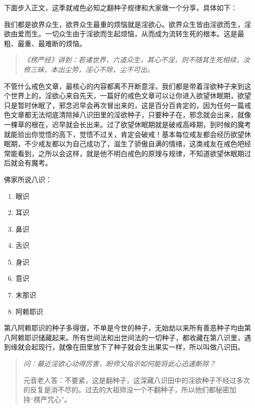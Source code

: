 \documentclass{ctexart}
\begin{document}
下面步入正文，这季就戒色必知之翻种子规律和大家做一个分享，具体如下：

我们都是欲界众生，欲界众生最重的烦恼就是淫欲心。欲界众生皆由淫欲而生，淫欲由爱而生。一切众生由于淫欲而生起烦恼，从而成为流转生死的根本。这是最粗、最重、最难断的烦恼。

\begin{quote}\it
    《楞严经》讲到：若诸世界，六道众生，其心不淫，则不随其生死相续，汝修三昧，本出尘劳，淫心不除，尘不可出。
\end{quote}

不管什么戒色文章，最核心的内容都离不开断意淫，我们都是带着淫欲种子来到这个世界上的，淫欲心来自先天，一篇好的戒色文章可以让你进入欲望休眠期，欲望只是暂时休眠了，邪念迟早会再次冒出来的，这是百分百肯定的，因为任何一篇戒色文章都无法彻底清除掉八识田里的淫欲种子，只要种子在，邪念就会出来，就像一棵草的根在，迟早就会长出来。过了欲望休眠期就是破戒高峰期，到时候的魔考就能验出你觉悟的高下，觉悟不过关，肯定会破戒！基本每位戒友都会经历欲望休眠期，不少戒友都以为自己成功了，滋生了骄傲自满的情绪，这类戒友在戒色吧经常能看到，之所以会这样，就是他不明白戒色的原理与规律，不知道欲望休眠期过后就会有魔考。

佛家所说八识：

\begin{multicols}{4}
    \begin{enumerate}
        \item 眼识
        \item 耳识
        \item 鼻识
        \item 舌识
        \item 身识
        \item 意识
        \item 末那识
        \item 阿赖耶识
    \end{enumerate}
\end{multicols}

第八阿赖耶识的种子多得很，不单是今世的种子，无始劫以来所有善恶种子均由第八阿赖耶识储藏起来。所有世间法和出世间法的一切种子，都收藏在第八识里，遇到缘就会起现行，就像在田里放下了种子就会生出果实一样，所以叫做八识田。

\begin{quotation}\it
    问：最近淫欲心动得厉害，盼师父指示如何能将此心迅速断除？

    元音老人答：不要紧，这是翻种子，这深藏八识田中的淫欲种子不经过多次的反复是消不尽的。过去的大祖师没一个不翻种子，所以他们都秘密加持“楞严咒心”。
\end{quotation}
\end{document}
